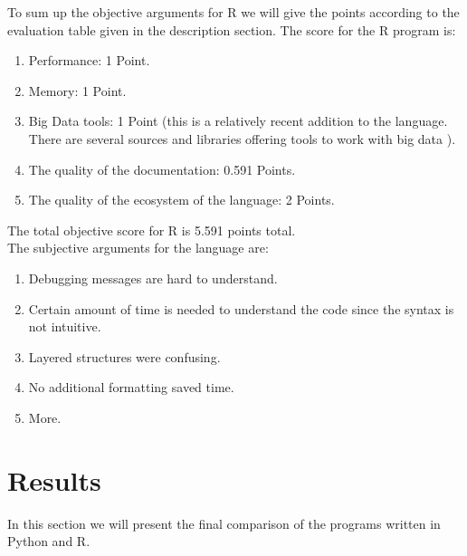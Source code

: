 \documentclass[
  twoside,
  11pt, a4paper,
  footinclude=true,
  headinclude=true,
  cleardoublepage=empty
]{scrreprt}
\begin{document}
    To sum up the objective arguments for R we will give the points according to the evaluation table given in the description section. The score for the R program is:
    \begin{enumerate}
        \item Performance: 1 Point.
        \item Memory: 1 Point.
        \item Big Data tools: 1 Point (this is a relatively recent addition to the language. There are several sources and libraries offering tools to work with big data \cite{r:BigData}).
        \item The quality of the documentation: 0.591 Points.
        \item The quality of the ecosystem of the language: 2 Points.
    \end{enumerate} 
    The total objective score for R is 5.591 points total.\\
    The subjective arguments for the language are:
    \begin{enumerate}
        \item Debugging messages are hard to understand.
        \item Certain amount of time is needed to understand the code since the syntax is not intuitive.
        \item Layered structures were confusing.
        \item No additional formatting saved time.
        \item More.
    \end{enumerate}
    
    \chapter{Results}
    In this section we will present the final comparison of the programs written in Python and R.
\end{document}
